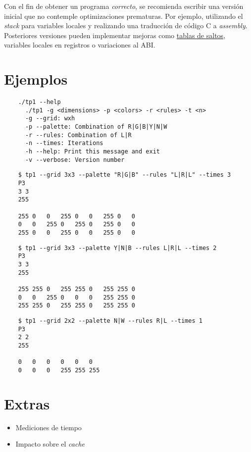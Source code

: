 \documentclass{article}
\begin{document}
Con el fin de obtener un programa \textit{correcto}, se recomienda escribir una versión inicial que no contemple
optimizaciones prematuras. Por ejemplo, utilizando el \textit{stack} para variables locales y realizando una traducción
de código C a \textit{assembly}. Posteriores versiones pueden implementar mejoras como \underline{tablas de saltos},
variables locales en registros o variaciones al ABI.

\pagebreak
\section{Ejemplos}

    \begin{verbatim}
    ./tp1 --help
      ./tp1 -g <dimensions> -p <colors> -r <rules> -t <n>
      -g --grid: wxh
      -p --palette: Combination of R|G|B|Y|N|W
      -r --rules: Combination of L|R
      -n --times: Iterations
      -h --help: Print this message and exit
      -v --verbose: Version number
    \end{verbatim}

    \begin{verbatim}
    $ tp1 --grid 3x3 --palette "R|G|B" --rules "L|R|L" --times 3
    P3
    3 3
    255

    255 0   0   255 0   0   255 0   0
    0   0   255 0   255 0   255 0   0 
    255 0   0   255 0   0   255 0   0
    \end{verbatim}

    \begin{verbatim}
    $ tp1 --grid 3x3 --palette Y|N|B --rules L|R|L --times 2
    P3
    3 3
    255

    255 255 0   255 255 0   255 255 0
    0   0   255 0   0   0   255 255 0
    255 255 0   255 255 0   255 255 0
    \end{verbatim}

    \begin{verbatim}
    $ tp1 --grid 2x2 --palette N|W --rules R|L --times 1
    P3
    2 2
    255

    0   0   0   0   0   0 
    0   0   0   255 255 255
    \end{verbatim}

\section{Extras}
\begin{itemize}
\item Mediciones de tiempo
\item Impacto sobre el \textit{cache}
\end{itemize}
\end{document}
